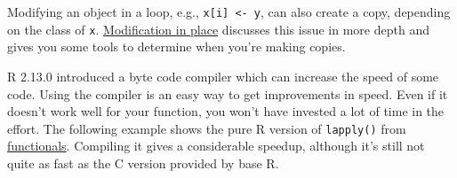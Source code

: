 Modifying an object in a loop, e.g., \texttt{x{[}i{]} \textless{}- y},
can also create a copy, depending on the class of \texttt{x}.
\hyperref[modification]{Modification in place} discusses this issue in
more depth and gives you some tools to determine when you're making
copies.


R 2.13.0 introduced a byte code compiler which can increase the speed of
some code. Using the compiler is an easy way to get improvements in
speed. Even if it doesn't work well for your function, you won't have
invested a lot of time in the effort. The following example shows the
pure R version of \texttt{lapply()} from \hyperref[lapply]{functionals}.
Compiling it gives a considerable speedup, although it's still not quite
as fast as the C version provided by base R. 

\begin{Shaded}
\begin{Highlighting}[]
\StringTok{ }
  \StringTok{ }\NormalTok{(}\NormalTok{, }
    \StringTok{ }
  \NormalTok{\}}
\NormalTok{\}}

\StringTok{ }

\StringTok{ }\NormalTok{(}\NormalTok{:}\NormalTok{)}
\NormalTok{(}
\NormalTok{)}
\end{Highlighting}
\end{Shaded}

